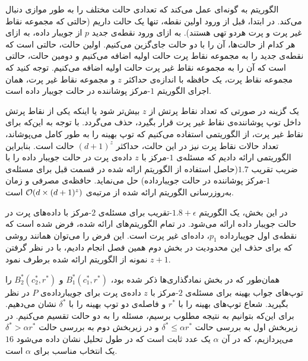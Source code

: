


الگوریتم به گونه‌ای عمل می‌کند که تعدادی حالت مختلف را به طور موازی دنبال می‌کند. در ابتدا، قبل از ورود اولین نقطه، تنها یک حالت داریم (حالتی که مجموعه نقاط غیر پرت و پرت هردو تهی هستند). به ازای ورود نقطه‌ی جدید $p$ از جویبار داده، به ازای هر کدام از حالت‌ها، آن را با دو حالت جای‌گزین می‌کنیم. اولین حالت، حالتی است که نقطه‌ی جدید را به مجموعه‌ نقاط پرت حالت اولیه اضافه می‌کنیم و دومین حالت، حالتی است که آن را به مجموعه نقاط غیر پرت حالت اولیه اضافه ‌می‌کنیم. توجه کنید که مجموعه نقاط پرت، یک حافظه‌ با اندازه‌ی حداکثر $z$ و مجموعه نقاط غیر پرت، همان اجرای الگوریتم $1$-مرکز پوشاننده در حالت جویبار داده است. 

یک گزینه در صورتی که تعداد نقاط‌ پرتش از $z$ بیش‌تر شود یا اینکه یکی از نقاط پرتش داخل توپ پوشاننده‌ی نقاط غیر پرت قرار بگیرد، حذف می‌گردد. با توجه به این‌که برای نقاط غیر پرت، از‌ الگوریتمی استفاده می‌کنیم که توپ بهینه را به طور کامل می‌پوشاند، تعداد حالات نقاط پرت نیز در این حالت، حداکثر $(d+1)^z$ حالت است. بنابراین الگوریتمی ارائه دادیم که مسئله‌ی $1$-مرکز با $z$ داده‌ی پرت در حالت جویبار داده را با ضریب تقریب $1.7$(حاصل استفاده از الگوریتم ارائه شده در قسمت قبل برای مسئله‌ی $1$-مرکز پوشاننده در حالت جویبارداده) حل می‌نماید. حافظه‌ی مصرفی و زمان به‌روزرسانی الگوریتم ارائه شده از مرتبه‌ی $\mathcal{O}(d \times (d+1)^z)$ است.


در این بخش، یک الگوریتم $1.8 + \epsilon$-تقریب برای مسئله‌ی $2$-مرکز با داده‌های پرت در حالت جویبار داده ارائه می‌شود. در تمام الگوریتم‌های ارائه شده، فرض شده است که نقطه‌ی اول جویبارداده $p_1$، داده‌ای غیر پرت است. این فرض را می‌توان همانند روشی که برای حذف این محدودیت در بخش دوم همین فصل انجام دادیم، با در نظر گرفتن $z+1$ نمونه از الگوریتم ارائه شده برطرف نمود.

همان‌طور که در بخش نماد‌گذاری‌ها ذکر شده بود، $B_1^*(c_1^*, r^*)$ و $B_2^*(c_2^*, r^*)$ را توپ‌های جواب بهینه برای مسئله‌ی $2$-مرکز با $z$ داده‌ی پرت برای جویبارداده‌ی $P$ در نظر بگیرید. شعاع توپ‌های بهینه را با $r^*$ و فاصله‌ی دو توپ بهینه را با $\delta^*$ نشان می‌دهیم. برای این‌که بتوانیم به نتیجه مطلوب برسیم، مسئله را به دو حالت تقسیم می‌کنیم. در زیربخش اول به بررسی حالت $\delta^* \leq \alpha r^*$ و در زیربخش دوم به بررسی حالت $\delta^* > \alpha r^*$ می‌پردازیم، که در آن $\alpha$ یک عدد ثابت است که در طول تحلیل نشان داده می‌شود $16$ یک انتخاب مناسب برای $\alpha$ است.


